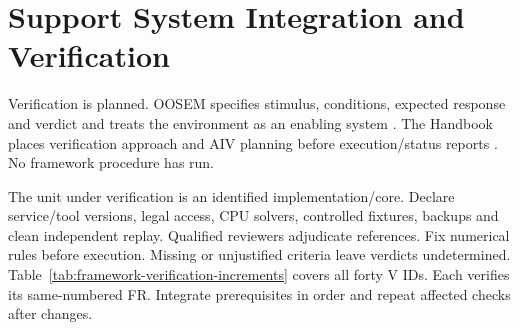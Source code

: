 \section{Support System Integration and Verification}
\label{section:integrate-and-verify-system}

Verification is planned. OOSEM specifies stimulus, conditions, expected response and verdict and treats the environment as an enabling system \citep[Secs.~17.3.8--17.3.9]{friedenthal2014practical}. The Handbook places verification approach and AIV planning before execution/status reports \citep[Secs.~I.3.1--I.3.6]{aguado2021cubesatse}. No framework procedure has run.

The unit under verification is an identified implementation/core. Declare service/tool versions, legal access, CPU solvers, controlled fixtures, backups and clean independent replay. Qualified reviewers adjudicate references. Fix numerical rules before execution. Missing or unjustified criteria leave verdicts undetermined. Table~\ref{tab:framework-verification-increments} covers all forty V IDs. Each verifies its same-numbered FR. Integrate prerequisites in order and repeat affected checks after changes.
